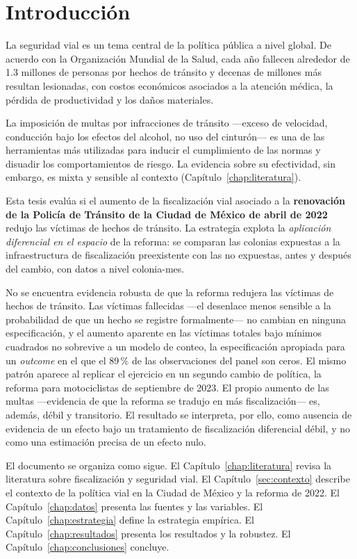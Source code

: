 \chapter*{Introducción}

\noindent
La seguridad vial es un tema central de la política pública a nivel global. De
acuerdo con la Organización Mundial de la Salud, cada año fallecen alrededor de
1.3 millones de personas por hechos de tránsito y decenas de millones más
resultan lesionadas, con costos económicos asociados a la atención médica, la
pérdida de productividad y los daños materiales.

La imposición de multas por infracciones de tránsito —exceso de velocidad,
conducción bajo los efectos del alcohol, no uso del cinturón— es una de las
herramientas más utilizadas para inducir el cumplimiento de las normas y
disuadir los comportamientos de riesgo. La evidencia sobre su efectividad, sin
embargo, es mixta y sensible al contexto (Capítulo~\ref{chap:literatura}).

Esta tesis evalúa si el aumento de la fiscalización vial asociado a la
\textbf{renovación de la Policía de Tránsito de la Ciudad de México de abril de
2022} redujo las víctimas de hechos de tránsito. La estrategia explota la
\emph{aplicación diferencial en el espacio} de la reforma: se comparan las
colonias expuestas a la infraestructura de fiscalización preexistente con las no
expuestas, antes y después del cambio, con datos a nivel colonia-mes.

No se encuentra evidencia robusta de que la reforma redujera las víctimas de
hechos de tránsito. Las víctimas fallecidas —el desenlace menos sensible a la
probabilidad de que un hecho se registre formalmente— no cambian en ninguna
especificación, y el aumento aparente en las víctimas totales bajo mínimos
cuadrados no sobrevive a un modelo de conteo, la especificación apropiada
para un \emph{outcome} en el que el 89\,\% de las observaciones del panel son
ceros. El mismo patrón aparece al replicar el ejercicio en un segundo cambio
de política, la reforma para motociclistas de septiembre de 2023. El propio
aumento de las multas —evidencia de que la reforma se tradujo en más
fiscalización— es, además, débil y transitorio. El resultado se interpreta,
por ello, como ausencia de evidencia de un efecto bajo un tratamiento de
fiscalización diferencial débil, y no como una estimación precisa de un
efecto nulo.

El documento se organiza como sigue. El Capítulo~\ref{chap:literatura} revisa la
literatura sobre fiscalización y seguridad vial. El Capítulo~\ref{sec:contexto}
describe el contexto de la política vial en la Ciudad de México y la reforma de
2022. El Capítulo~\ref{chap:datos} presenta las fuentes y las variables. El
Capítulo~\ref{chap:estrategia} define la estrategia empírica. El
Capítulo~\ref{chap:resultados} presenta los resultados y la robustez. El
Capítulo~\ref{chap:conclusiones} concluye.
